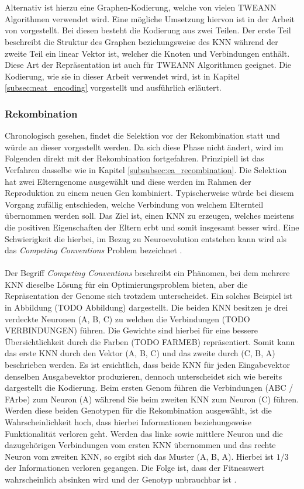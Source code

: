 \\\\
Alternativ ist hierzu eine Graphen-Kodierung, welche von vielen \ac{TWEANN} Algorithmen verwendet wird. Eine mögliche Umsetzung hiervon ist in der Arbeit \cite{pujol1998evolving} von \citeauthor{pujol1998evolving} vorgestellt. Bei diesen besteht die Kodierung aus zwei Teilen. Der erste Teil beschreibt die Struktur des Graphen beziehungsweise des \ac{KNN} während der zweite Teil ein linear Vektor ist, welcher die Knoten und Verbindungen enthält. Diese Art der Repräsentation ist auch für \ac{TWEANN} Algorithmen geeignet. Die Kodierung, wie sie in dieser Arbeit verwendet wird, ist in Kapitel \ref{subsec:neat_encoding} vorgestellt und ausführlich erläutert.

\subsubsection{Rekombination}
Chronologisch gesehen, findet die Selektion vor der Rekombination statt und würde an dieser vorgestellt werden. Da sich diese Phase nicht ändert, wird im Folgenden direkt mit der Rekombination fortgefahren. Prinzipiell ist das Verfahren dasselbe wie in Kapitel \ref{subsubsec:ea_recombination}. Die Selektion hat zwei Elterngenome ausgewählt und diese werden im Rahmen der Reproduktion zu einem neuen Gen kombiniert. Typischerweise würde bei diesem Vorgang zufällig entschieden, welche Verbindung von welchem Elternteil übernommen werden soll. Das Ziel ist, einen \ac{KNN} zu erzeugen, welches meistens die positiven Eigenschaften der Eltern erbt und somit insgesamt besser wird. Eine Schwierigkeit die hierbei, im Bezug zu Neuroevolution entstehen kann wird als das \emph{Competing Conventions} Problem bezeichnet \cite{stanley2002evolving}.
\\\\ %
Der Begriff \emph{Competing Conventions} beschreibt ein Phänomen, bei dem mehrere \ac{KNN} dieselbe Lösung für ein Optimierungsproblem bieten, aber die Repräsentation der Genome sich trotzdem unterscheidet. Ein solches Beispiel ist in Abbildung (TODO Abbildung) dargestellt. Die beiden \ac{KNN} besitzen je drei verdeckte Neuronen (A, B, C) zu welchen die Verbindungen (TODO VERBINDUNGEN) führen. Die Gewichte sind hierbei für eine bessere Übersichtlichkeit durch die Farben (TODO FARMEB) repräsentiert. Somit kann das erste \ac{KNN} durch den Vektor (A, B, C) und das zweite durch (C, B, A) beschrieben werden. Es ist ersichtlich, dass beide \ac{KNN} für jeden Eingabevektor denselben Ausgabevektor produzieren, dennoch unterscheidet sich wie bereits dargestellt die Kodierung. Beim ersten Genom führen die Verbindungen (ABC / FArbe) zum Neuron (A) während Sie beim zweiten \ac{KNN} zum Neuron (C) führen. Werden diese beiden Genotypen für die Rekombination ausgewählt, ist die Wahrscheinlichkeit hoch, dass hierbei Informationen beziehungsweise Funktionalität verloren geht. Werden das linke sowie mittlere Neuron und die dazugehörigen Verbindungen vom ersten \ac{KNN} übernommen und das rechte Neuron vom zweiten \ac{KNN}, so ergibt sich das Muster (A, B, A). Hierbei ist $1/3$ der Informationen verloren gegangen. Die Folge ist, dass der Fitnesswert wahrscheinlich absinken wird und der Genotyp unbrauchbar ist \cite{stanley2002evolving}. 
